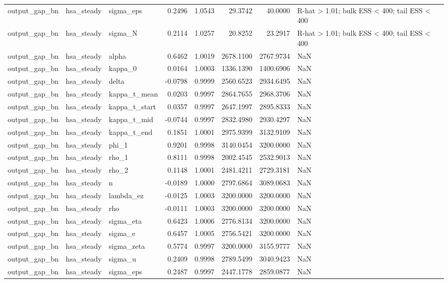 \begin{tabular}{lllrrrrl}
output\_gap\_bn & hsa\_steady & sigma\_eps & 0.2496 & 1.0543 & 29.3742 & 40.0000 & R-hat > 1.01; bulk ESS < 400; tail ESS < 400 \\
output\_gap\_bn & hsa\_steady & sigma\_N & 0.2114 & 1.0257 & 20.8252 & 23.2917 & R-hat > 1.01; bulk ESS < 400; tail ESS < 400 \\
output\_gap\_bn & hsa\_steady & alpha & 0.6462 & 1.0019 & 2678.1100 & 2767.9734 & NaN \\
output\_gap\_bn & hsa\_steady & kappa\_0 & 0.0164 & 1.0003 & 1336.1390 & 1400.6906 & NaN \\
output\_gap\_bn & hsa\_steady & delta & -0.0798 & 0.9999 & 2560.6523 & 2934.6495 & NaN \\
output\_gap\_bn & hsa\_steady & kappa\_t\_mean & 0.0203 & 0.9997 & 2864.7655 & 2968.3706 & NaN \\
output\_gap\_bn & hsa\_steady & kappa\_t\_start & 0.0357 & 0.9997 & 2647.1997 & 2895.8333 & NaN \\
output\_gap\_bn & hsa\_steady & kappa\_t\_mid & -0.0744 & 0.9997 & 2832.4980 & 2930.4297 & NaN \\
output\_gap\_bn & hsa\_steady & kappa\_t\_end & 0.1851 & 1.0001 & 2975.9399 & 3132.9109 & NaN \\
output\_gap\_bn & hsa\_steady & phi\_1 & 0.9201 & 0.9998 & 3140.0454 & 3200.0000 & NaN \\
output\_gap\_bn & hsa\_steady & rho\_1 & 0.8111 & 0.9998 & 2002.4545 & 2532.9013 & NaN \\
output\_gap\_bn & hsa\_steady & rho\_2 & 0.1148 & 1.0001 & 2481.4211 & 2729.3181 & NaN \\
output\_gap\_bn & hsa\_steady & n & -0.0189 & 1.0000 & 2797.6864 & 3089.0683 & NaN \\
output\_gap\_bn & hsa\_steady & lambda\_ez & -0.0125 & 1.0003 & 3200.0000 & 3200.0000 & NaN \\
output\_gap\_bn & hsa\_steady & rho & -0.0111 & 1.0003 & 3200.0000 & 3200.0000 & NaN \\
output\_gap\_bn & hsa\_steady & sigma\_eta & 0.6423 & 1.0006 & 2776.8134 & 3200.0000 & NaN \\
output\_gap\_bn & hsa\_steady & sigma\_e & 0.6457 & 1.0005 & 2756.5421 & 3200.0000 & NaN \\
output\_gap\_bn & hsa\_steady & sigma\_zeta & 0.5774 & 0.9997 & 3200.0000 & 3155.9777 & NaN \\
output\_gap\_bn & hsa\_steady & sigma\_u & 0.2409 & 0.9998 & 2789.5499 & 3040.9423 & NaN \\
output\_gap\_bn & hsa\_steady & sigma\_eps & 0.2487 & 0.9997 & 2447.1778 & 2859.0877 & NaN \\

\end{tabular}
